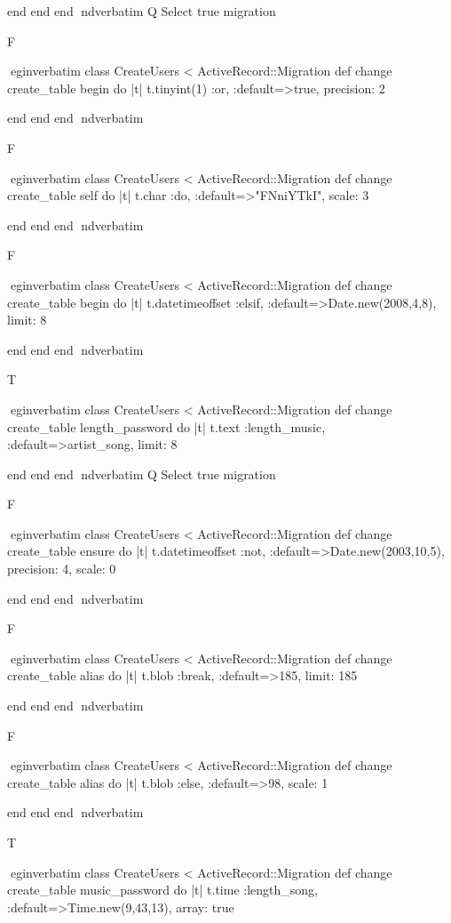     end 
  end 
end
nd{verbatim}
Q
 Select true migration

F

egin{verbatim}
 class CreateUsers < ActiveRecord::Migration 
  def change 
    create_table begin do |t| 
      t.tinyint(1) :or, :default=>true, precision: 2
    
    end 
  end 
end
nd{verbatim}

F

egin{verbatim}
 class CreateUsers < ActiveRecord::Migration 
  def change 
    create_table self do |t| 
      t.char :do, :default=>"FNniYTkI", scale: 3
    
    end 
  end 
end
nd{verbatim}

F

egin{verbatim}
 class CreateUsers < ActiveRecord::Migration 
  def change 
    create_table begin do |t| 
      t.datetimeoffset :elsif, :default=>Date.new(2008,4,8), limit: 8
    
    end 
  end 
end
nd{verbatim}

T

egin{verbatim}
 class CreateUsers < ActiveRecord::Migration 
  def change 
    create_table length_password do |t| 
      t.text :length_music, :default=>artist_song, limit: 8
    
    end 
  end 
end
nd{verbatim}
Q
 Select true migration

F

egin{verbatim}
 class CreateUsers < ActiveRecord::Migration 
  def change 
    create_table ensure do |t| 
      t.datetimeoffset :not, :default=>Date.new(2003,10,5), precision: 4, scale: 0
    
    end 
  end 
end
nd{verbatim}

F

egin{verbatim}
 class CreateUsers < ActiveRecord::Migration 
  def change 
    create_table alias do |t| 
      t.blob :break, :default=>185, limit: 185
    
    end 
  end 
end
nd{verbatim}

F

egin{verbatim}
 class CreateUsers < ActiveRecord::Migration 
  def change 
    create_table alias do |t| 
      t.blob :else, :default=>98, scale: 1
    
    end 
  end 
end
nd{verbatim}

T

egin{verbatim}
 class CreateUsers < ActiveRecord::Migration 
  def change 
    create_table music_password do |t| 
      t.time :length_song, :default=>Time.new(9,43,13), array: true
    
